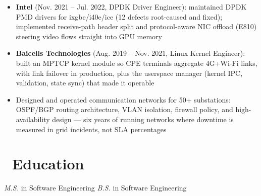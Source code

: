 \documentclass{resume}
\begin{document}
\begin{singlespacing}
\begin{itemize}
    \item \textbf{Intel} (Nov. 2021 -- Jul. 2022, DPDK Driver Engineer): maintained DPDK PMD drivers for ixgbe/i40e/ice (12 defects root-caused and fixed); implemented receive-path header split and protocol-aware NIC offload (E810) steering video flows straight into GPU memory
    \item \textbf{Baicells Technologies} (Aug. 2019 -- Nov. 2021, Linux Kernel Engineer): built an MPTCP kernel module so CPE terminals aggregate 4G+Wi-Fi links, with link failover in production, plus the userspace manager (kernel IPC, validation, state sync) that made it operable
\end{itemize}
\end{singlespacing}

\begin{singlespacing}
\begin{itemize}
    \item Designed and operated communication networks for 50+ substations: OSPF/BGP routing architecture, VLAN isolation, firewall policy, and high-availability design --- six years of running networks where downtime is measured in grid incidents, not SLA percentages
\end{itemize}
\end{singlespacing}

\section{\faGraduationCap\ Education}
\textit{M.S.} in Software Engineering
\textit{B.S.} in Software Engineering
\end{document}
